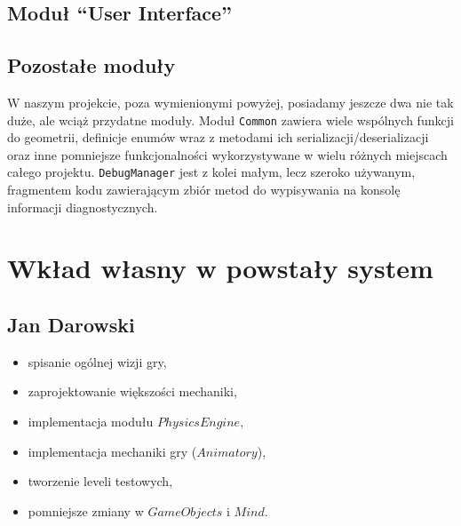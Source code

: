 \documentclass[licencjacka]{pracamgr}
\begin{document}
  \section{Moduł ``User Interface''}




  \section{Pozostałe moduły}
    W naszym projekcie, poza wymienionymi powyżej, posiadamy jeszcze dwa nie tak duże, ale wciąż przydatne moduły. Moduł
    \texttt{Common} zawiera wiele wspólnych funkcji do geometrii, definicje enumów wraz z metodami ich
    serializacji/deserializacji oraz inne pomniejsze funkcjonalności wykorzystywane w wielu różnych miejscach całego
    projektu. \texttt{DebugManager} jest z kolei małym, lecz szeroko używanym, fragmentem kodu zawierającym zbiór metod
    do wypisywania na konsolę informacji diagnostycznych.


\chapter{Wkład własny w powstały system}

  \section{Jan Darowski}
  \begin{itemize}
   \item spisanie ogólnej wizji gry,
   \item zaprojektowanie większości mechaniki,
   \item implementacja modułu $PhysicsEngine$,
   \item implementacja mechaniki gry ($Animatory$),
   \item tworzenie leveli testowych,
   \item pomniejsze zmiany w $GameObjects$ i $Mind$.
  \end{itemize}
\end{document}
